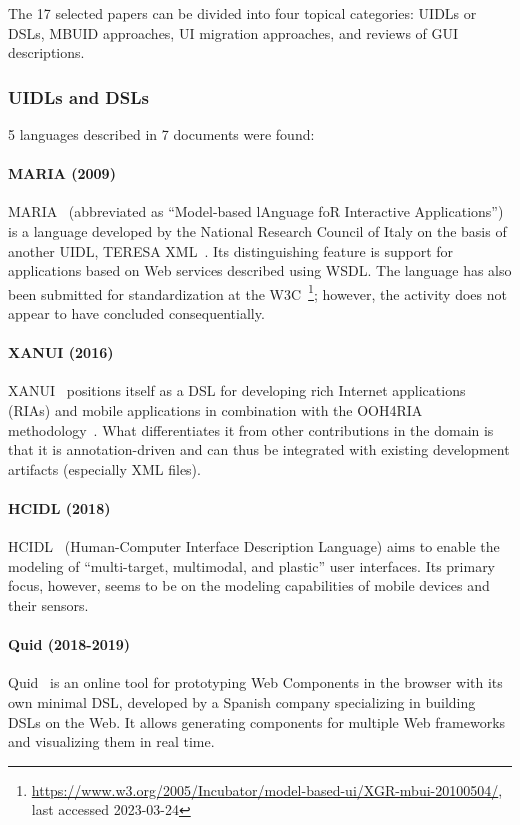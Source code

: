 The 17 selected papers can be divided into four topical categories: UIDLs or DSLs, MBUID approaches, UI migration approaches, and reviews of GUI descriptions.

\subsubsection{UIDLs and DSLs}
5 languages described in 7 documents were found:

\paragraph{MARIA (2009)}
MARIA~\cite{Paterno2009, MariaPDF} (abbreviated as \enquote{Model-based lAnguage foR Interactive Applications}) is a language developed by the National Research Council of Italy on the basis of another UIDL, TERESA XML~\cite{mori2004}.
Its distinguishing feature is support for applications based on Web services described using WSDL\@.
The language has also been submitted for standardization at the W3C~\footnote{\url{https://www.w3.org/2005/Incubator/model-based-ui/XGR-mbui-20100504/}, last accessed 2023-03-24};
however, the activity does not appear to have concluded consequentially.

\paragraph{XANUI (2016)}
XANUI~\cite{hermida2016xanui} positions itself as a DSL for developing rich Internet applications (RIAs) and mobile applications in combination with the OOH4RIA methodology~\cite{Meli2008}.
What differentiates it from other contributions in the domain is that it is annotation-driven and can thus be integrated with existing development artifacts (especially XML files).

\paragraph{HCIDL (2018)}
HCIDL~\cite{Gaouar2018} (Human-Computer Interface Description Language) aims to enable the modeling of \enquote{multi-target, multimodal, and plastic} user interfaces.
Its primary focus, however, seems to be on the modeling capabilities of mobile devices and their sensors.

\paragraph{Quid (2018-2019)}
Quid~\cite{molina2018quid, Molina2019} is an online tool for prototyping Web Components in the browser with its own minimal DSL, developed by a Spanish company specializing in building DSLs on the Web.
It allows generating components for multiple Web frameworks and visualizing them in real time.


